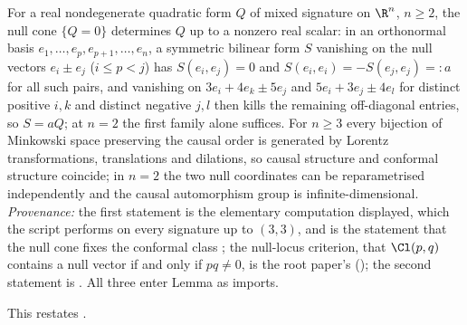 For a real nondegenerate quadratic form $Q$ of mixed signature on $\R^{n}$, $n \geq 2$, the null cone $\{Q = 0\}$ determines $Q$ up to a nonzero real scalar: in an orthonormal basis $e_{1}, \dots, e_{p}, e_{p+1}, \dots, e_{n}$, a symmetric bilinear form $S$ vanishing on the null vectors $e_{i} \pm e_{j}$ ($i \leq p < j$) has $S(e_{i}, e_{j}) = 0$ and $S(e_{i}, e_{i}) = -S(e_{j}, e_{j}) =: a$ for all such pairs, and vanishing on $3e_{i} + 4e_{k} \pm 5e_{j}$ and $5e_{i} + 3e_{j} \pm 4e_{l}$ for distinct positive $i, k$ and distinct negative $j, l$ then kills the remaining off-diagonal entries, so $S = aQ$; at $n = 2$ the first family alone suffices. For $n \geq 3$ every bijection of Minkowski space preserving the causal order is generated by Lorentz transformations, translations and dilations, so causal structure and conformal structure coincide; in $n = 2$ the two null coordinates can be reparametrised independently and the causal automorphism group is infinite-dimensional. \emph{Provenance:} the first statement is the elementary computation displayed, which the script performs on every signature up to $(3,3)$, and is the statement that the null cone fixes the conformal class \cite{HawkingEllis1973}; the null-locus criterion, that $\Cl(p,q)$ contains a null vector if and only if $pq \neq 0$, is the root paper's \cite[Prop.~3.3]{ButlerT1} (); the second statement is \cite{Zeeman1964}. All three enter Lemma  as imports.

This restates .
